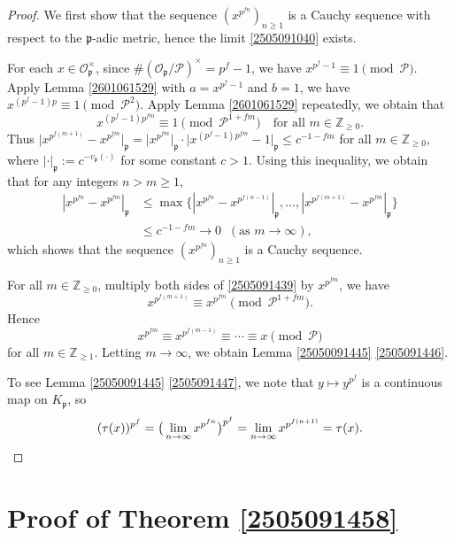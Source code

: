 \documentclass[12pt]{amsart}
\theoremstyle{plain}
\theoremstyle{definition}
\theoremstyle{remark}
\numberwithin{equation}{section}
\newcommand{\Z}{\mathbb Z}
\begin{document}
	\begin{proof}
		We first show that the sequence $(x^{p^{fn}})_{n\ge1}$ is a Cauchy sequence with respect to the $\mathfrak{p}$-adic metric, hence the limit \eqref{2505091040} exists.
		
		For each $x\in\mathcal{O}_{\mathfrak{p}}^{\times}$, since $\#(\mathcal{O}_{\mathfrak{p}}/\mathcal{P})^\times=p^f-1$,  we have $x^{p^f-1}\equiv1\pmod{\mathcal{P}}$.
		Apply Lemma \ref{2601061529} with $a=x^{p^f-1}$ and $b=1$, we have $x^{(p^f-1)p}\equiv1\pmod{\mathcal{P}^{2}}$. Apply Lemma \ref{2601061529} repeatedly, we obtain that
		\begin{equation}\label{2505091439}
			x^{(p^f-1)p^{fm}}\equiv 1\!\!\pmod{\mathcal{P}^{1+fm}}\quad\text{for all $m\in\Z_{\ge0}$}.
		\end{equation}
		Thus $\big|x^{p^{f(m+1)}}- x^{p^{fm}}\big|_{\mathfrak{p}}=\big|x^{p^{fm}}\big|_{\mathfrak{p}}\cdot\big|x^{(p^f-1)p^{fm}}-1\big|_{\mathfrak{p}}\le c^{-1-fm}$ for all $m\in\Z_{\ge0}$, where $|\cdot|_\mathfrak{p}:=c^{-v_{\mathfrak{p}}(\cdot)}$ for some constant $c>1$. Using this inequality, we obtain that for any integers $n>m\ge1$, 
		\[\begin{split}
			|x^{p^{fn}}- x^{p^{fm}}|_{\mathfrak{p}}&\le\max\big\{|x^{p^{fn}}- x^{p^{f(n-1)}}|_{\mathfrak{p}},\dots,|x^{p^{f(m+1)}}- x^{p^{fm}}|_{\mathfrak{p}}\big\}\\
			&\le c^{-1-fm}\to0\;\;(\text{as } m\to\infty),
		\end{split}\]
		which shows that the sequence $(x^{p^{fn}})_{n\ge1}$ is a Cauchy sequence.
		
		For all $m\in\Z_{\ge0}$, multiply both sides of \eqref{2505091439} by $x^{p^{fm}}$, we have
		\[x^{p^{f(m+1)}}\equiv x^{p^{fm}}\pmod{\mathcal{P}^{1+fm}}.\]
		Hence
		\[x^{p^{fm}}\equiv x^{p^{f(m-1)}}\equiv\cdots\equiv x\pmod{\mathcal{P}}\]
		for all $m\in\Z_{\ge1}$. Letting $m\to\infty$, we obtain Lemma \ref{25050091445} \eqref{2505091446}. 
		
		To see Lemma \ref{25050091445} \eqref{2505091447}, we note that $y\mapsto y^{p^f}$ is a continuous map on $K_{\mathfrak{p}}$, so
		\[(\tau(x))^{p^f}=\big(\lim_{n\to\infty}x^{p^{fn}}\big)^{p^f}=\lim_{n\to\infty}x^{p^{f(n+1)}}=\tau(x).\qedhere\]
	\end{proof}
	
	\section{Proof of Theorem \ref{2505091458}}
	
\end{document}
